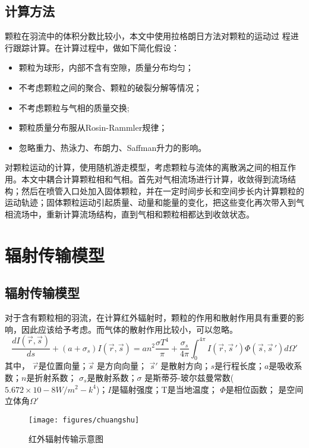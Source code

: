 \subsection{计算方法}
颗粒在羽流中的体积分数比较小，本文中使用拉格朗日方法对颗粒的运动过
程进行跟踪计算。在计算过程中，做如下简化假设：
\begin{itemize}
	\item 颗粒为球形，内部不含有空隙，质量分布均匀；
	\item 不考虑颗粒之间的聚合、颗粒的破裂分解等情况；
	\item 不考虑颗粒与气相的质量交换;
	\item 颗粒质量分布服从Rosin-Rammler规律；
	\item 忽略重力、热泳力、布朗力、Saffman升力的影响。
\end{itemize}
对颗粒运动的计算，使用随机游走模型，考虑颗粒与流体的离散涡之间的相互作用。本文中耦合计算颗粒相和气相。首先对气相流场进行计算，收敛得到流场结构；然后在喷管入口处加入固体颗粒，并在一定时间步长和空间步长内计算颗粒的运动轨迹；固体颗粒运动引起质量、动量和能量的变化，把这些变化再次带入到气相流场中，重新计算流场结构，直到气相和颗粒相都达到收敛状态。
\section{辐射传输模型}
\subsection{辐射传输模型}
对于含有颗粒相的羽流，在计算红外辐射时，颗粒的作用和散射作用具有重要的影响，因此应该给予考虑。而气体的散射作用比较小，可以忽略。
\begin{equation}
\frac{{dI(\vec r,\vec s)}}{{ds}} + \left( {a + {\sigma _s}} \right)I\left( {\vec r,\vec s} \right) = a{n^2}\frac{{\sigma {T^4}}}{\pi } + \frac{{{\sigma _s}}}{{4\pi }}\int_0^{4\pi } {I\left( {\vec r,\vec s\,'} \right)} \Phi (\vec s,\vec s\,')d\Omega '\label{eq:hongwaifushe}
\end{equation}
其中， $\vec{r}$是位置向量；$\vec{s}$ 是方向向量； $\vec s'$ 是散射方向；$s$是行程长度；$a$是吸收系数；$n$是折射系数； $\sigma _s$是散射系数；$\sigma $ 是斯蒂芬-玻尔兹曼常数($5.672×10-8W/m^2-k^4$)；$I$是辐射强度；T是当地温度； $\Phi$是相位函数； 是空间立体角$\Omega '$

\begin{figure}[htbp]
	\centering
	\texttt{[image: figures/chuangshu]}
	\caption{红外辐射传输示意图}
	\label{fig:chuangshu}
\end{figure}
